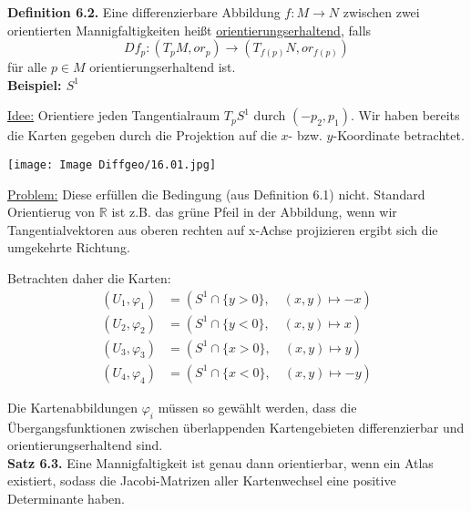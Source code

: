 \documentclass[fleqn, 12pt, letterpaper]{article}
\begin{document}
\vspace{1em}

\textbf{Definition 6.2.}
Eine differenzierbare Abbildung \( f : M \to N \) zwischen zwei orientierten Mannigfaltigkeiten heißt \underline{orientierungserhaltend}, falls
\[
Df_p : (T_p M, or_p) \longrightarrow (T_{f(p)} N, or_{f(p)})
\]
für alle \( p \in M \) orientierungserhaltend ist.\\

\textbf{Beispiel: \( S^1 \)}

\underline{Idee:} Orientiere jeden Tangentialraum \( T_p S^1 \) durch $(-p_2,p_1)$.  
Wir haben bereits die Karten gegeben durch die Projektion auf die \(x\)- bzw. \(y\)-Koordinate betrachtet.

\texttt{[image: Image Diffgeo/16.01.jpg]}
\vspace{0.5em}

\underline{Problem:} Diese erfüllen die Bedingung (aus Definition 6.1) nicht. Standard Orientierug von $\mathbb{R}$ ist z.B. das grüne Pfeil in der Abbildung, wenn wir Tangentialvektoren aus oberen rechten auf x-Achse projizieren ergibt sich die umgekehrte Richtung.

\vspace{0.5em}

Betrachten daher die Karten:
\begin{align*}
(U_1, \varphi_1) &= (S^1 \cap \{y > 0\}, \quad (x, y) \mapsto -x) \\
(U_2, \varphi_2) &= (S^1 \cap \{y < 0\}, \quad (x, y) \mapsto x) \\
(U_3, \varphi_3) &= (S^1 \cap \{x > 0\}, \quad (x, y) \mapsto y) \\
(U_4, \varphi_4) &= (S^1 \cap \{x < 0\}, \quad (x, y) \mapsto -y)
\end{align*}

Die Kartenabbildungen \( \varphi_i \) müssen so gewählt werden, dass die Übergangsfunktionen zwischen überlappenden Kartengebieten differenzierbar und orientierungserhaltend sind.\\

\textbf{Satz 6.3.}
Eine Mannigfaltigkeit ist genau dann orientierbar, wenn ein Atlas existiert, sodass die Jacobi-Matrizen aller Kartenwechsel eine positive Determinante haben.
\end{document}
